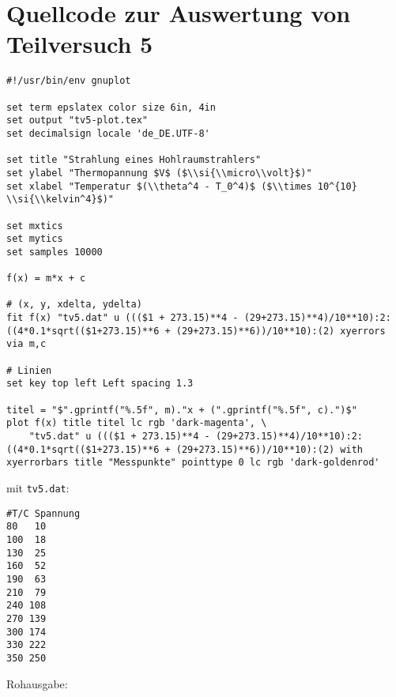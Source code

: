 \section{\gnuplot{} Quellcode zur Auswertung von Teilversuch 5}
    \label{appdx:gnuplotTV5}
    {  
        \renewcommand{\fcolorbox}[4][]{#4}
        \begin{verbatim}
#!/usr/bin/env gnuplot

set term epslatex color size 6in, 4in
set output "tv5-plot.tex"
set decimalsign locale 'de_DE.UTF-8'

set title "Strahlung eines Hohlraumstrahlers"
set ylabel "Thermopannung $V$ ($\\si{\\micro\\volt}$)"
set xlabel "Temperatur $(\\theta^4 - T_0^4)$ ($\\times 10^{10} \\si{\\kelvin^4}$)"

set mxtics
set mytics
set samples 10000

f(x) = m*x + c

# (x, y, xdelta, ydelta)
fit f(x) "tv5.dat" u ((($1 + 273.15)**4 - (29+273.15)**4)/10**10):2:((4*0.1*sqrt(($1+273.15)**6 + (29+273.15)**6))/10**10):(2) xyerrors via m,c

# Linien
set key top left Left spacing 1.3

titel = "$".gprintf("%.5f", m)."x + (".gprintf("%.5f", c).")$"
plot f(x) title titel lc rgb 'dark-magenta', \
    "tv5.dat" u ((($1 + 273.15)**4 - (29+273.15)**4)/10**10):2:((4*0.1*sqrt(($1+273.15)**6 + (29+273.15)**6))/10**10):(2) with xyerrorbars title "Messpunkte" pointtype 0 lc rgb 'dark-goldenrod'
        \end{verbatim}
    }
    mit \texttt{tv5.dat}:
    \begin{verbatim}
#T/C Spannung
80   10
100  18
130  25
160  52
190  63
210  79
240 108
270 139
300 174
330 222
350 250
    \end{verbatim}
Rohausgabe:
